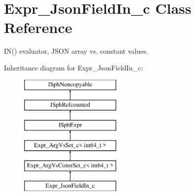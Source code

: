 \hypertarget{classExpr__JsonFieldIn__c}{\section{Expr\-\_\-\-Json\-Field\-In\-\_\-c Class Reference}
\label{classExpr__JsonFieldIn__c}
}


I\-N() evaluator, J\-S\-O\-N array vs. constant values.  


Inheritance diagram for Expr\-\_\-\-Json\-Field\-In\-\_\-c\-:\begin{figure}[H]
\begin{center}
\leavevmode
\includegraphics[height=6.000000cm]{classExpr__JsonFieldIn__c}
\end{center}
\end{figure}
